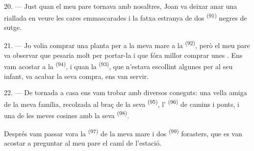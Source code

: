 \VUsaut{3.0mm}

20. --- Just quan el meu pare tornava amb nosaltres, Joan va deixar anar una
riallada en veure les cares emmascarades i la fatxa estranya de dos
 \textsuperscript{(91)} negres de sutge.

21. --- Jo volia comprar una planta per a la meva mare a la 
\textsuperscript{(92)}, però el meu pare va observar que pesaria molt per
portar-la i que fóra millor comprar unes . Ens vam acostar a la
 \textsuperscript{(94)}, i quan la 
\textsuperscript{(93)}, que n'estava escollint algunes per al seu infant, va acabar
la seva compra, ens van servir.

22. --- De tornada a casa ens vam trobar amb diversos coneguts: una vella amiga
de la meva família, recolzada al braç de la seva 
\textsuperscript{(95)}, l' \textsuperscript{(96)} de camins i
ponts, i una de les meves cosines amb la seva 
\textsuperscript{(98)}.

Després vam passar vora la  \textsuperscript{(97)} de la meva mare
i dos  \textsuperscript{(99)} forasters, que es van acostar a
preguntar al meu pare el camí de l'estació.
\VUsaut{6.0mm}
\VUfilet{22mm}
